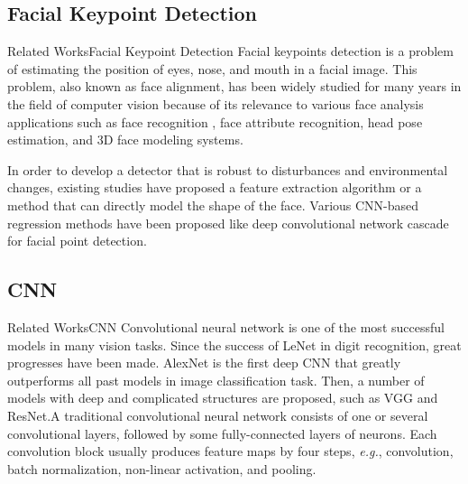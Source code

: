 \documentclass{beamer}
\begin{document}
\subsection{Facial Keypoint Detection}
\begin{frame}{Related Works}{Facial Keypoint Detection}
Facial keypoints detection is a problem of estimating the position of eyes, nose, and mouth in a facial image. This problem, also known as face alignment, has been widely studied for many years in the field of computer vision because of its relevance to various face analysis applications such as face recognition , face attribute recognition, head pose estimation, and 3D face modeling systems.

In order to develop a detector that is robust to disturbances and environmental changes, existing studies have proposed a feature extraction algorithm\cite{1717463,5539992} or a method that can directly model the shape of the face\cite{Cootes2000AnIT,10.1007/BFb0054760}. Various CNN-based regression methods have been proposed like deep convolutional network cascade for facial point detection\cite{6619290}.
\end{frame}
\subsection{CNN}
\begin{frame}{Related Works}{CNN}
Convolutional neural network is one of the most successful models in many vision tasks. Since the success of LeNet\cite{726791} in digit recognition, great progresses have been made. AlexNet\cite{NIPS2012_c399862d} is the first deep CNN that greatly outperforms all past models in image classification task. Then, a number of models with deep and complicated structures are proposed, such as VGG\cite{brusilovsky:simonyan2014very} and ResNet\cite{7780459}.A traditional convolutional neural network consists of one or several convolutional layers, followed by some fully-connected layers of neurons. Each convolution block usually produces feature maps by four steps, \emph{e.g.}, convolution, batch normalization, non-linear activation, and pooling.
\end{frame}
\end{document}
